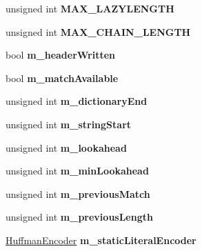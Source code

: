 \begin{DoxyCompactItemize}
\item 
\hypertarget{class_deflator_a821630c70545472963ac78bda4b46ac1}{
unsigned int {\bfseries MAX\_\-LAZYLENGTH}}
\label{class_deflator_a821630c70545472963ac78bda4b46ac1}

\item 
\hypertarget{class_deflator_a29f0111d74dfdcf365f84ff070714504}{
unsigned int {\bfseries MAX\_\-CHAIN\_\-LENGTH}}
\label{class_deflator_a29f0111d74dfdcf365f84ff070714504}

\item 
\hypertarget{class_deflator_a061a05e91d67cdf0d326ccf870cf7ef1}{
bool {\bfseries m\_\-headerWritten}}
\label{class_deflator_a061a05e91d67cdf0d326ccf870cf7ef1}

\item 
\hypertarget{class_deflator_a5241d030b8b368014b1c04281bf87fc3}{
bool {\bfseries m\_\-matchAvailable}}
\label{class_deflator_a5241d030b8b368014b1c04281bf87fc3}

\item 
\hypertarget{class_deflator_a8e20cb9e5a29755b016386778221c825}{
unsigned int {\bfseries m\_\-dictionaryEnd}}
\label{class_deflator_a8e20cb9e5a29755b016386778221c825}

\item 
\hypertarget{class_deflator_a42a99f00a21bdf38d9daa15dd2ec8a5d}{
unsigned int {\bfseries m\_\-stringStart}}
\label{class_deflator_a42a99f00a21bdf38d9daa15dd2ec8a5d}

\item 
\hypertarget{class_deflator_ae7b072afd802843284402d648e64412d}{
unsigned int {\bfseries m\_\-lookahead}}
\label{class_deflator_ae7b072afd802843284402d648e64412d}

\item 
\hypertarget{class_deflator_a3646115b10f173efb62402985657bb05}{
unsigned int {\bfseries m\_\-minLookahead}}
\label{class_deflator_a3646115b10f173efb62402985657bb05}

\item 
\hypertarget{class_deflator_af7bedc29fcbbdf6b8bf3aa8e06a3945a}{
unsigned int {\bfseries m\_\-previousMatch}}
\label{class_deflator_af7bedc29fcbbdf6b8bf3aa8e06a3945a}

\item 
\hypertarget{class_deflator_a2767a520eafdf665867a5e7d1de058d7}{
unsigned int {\bfseries m\_\-previousLength}}
\label{class_deflator_a2767a520eafdf665867a5e7d1de058d7}

\item 
\hypertarget{class_deflator_af98457df799bd1bfabcbff9a64ee313b}{
\hyperlink{class_huffman_encoder}{HuffmanEncoder} {\bfseries m\_\-staticLiteralEncoder}}
\label{class_deflator_af98457df799bd1bfabcbff9a64ee313b}


\end{DoxyCompactItemize}
